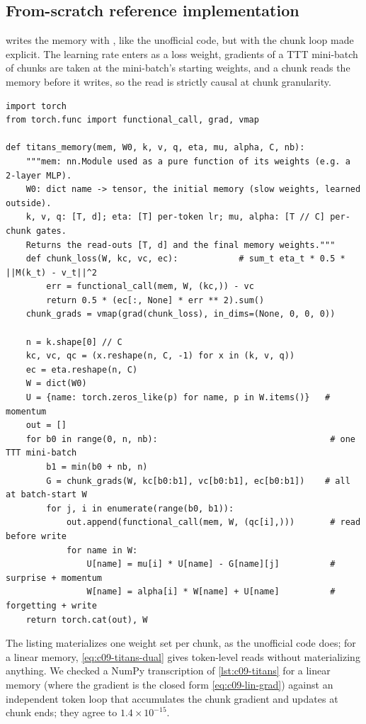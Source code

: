 \subsection{From-scratch reference implementation}

 writes the memory with , like the unofficial code, but
with the chunk loop made explicit. The learning rate enters as a loss weight, gradients of a
TTT mini-batch of  chunks are taken at the mini-batch's starting weights, and a chunk
reads the memory before it writes, so the read is strictly causal at chunk granularity.

\begin{lstlisting}[caption={Reference implementation (ours): Titans-style neural memory with momentum and forgetting.},label={lst:c09-titans}]
import torch
from torch.func import functional_call, grad, vmap

def titans_memory(mem, W0, k, v, q, eta, mu, alpha, C, nb):
    """mem: nn.Module used as a pure function of its weights (e.g. a 2-layer MLP).
    W0: dict name -> tensor, the initial memory (slow weights, learned outside).
    k, v, q: [T, d]; eta: [T] per-token lr; mu, alpha: [T // C] per-chunk gates.
    Returns the read-outs [T, d] and the final memory weights."""
    def chunk_loss(W, kc, vc, ec):            # sum_t eta_t * 0.5 * ||M(k_t) - v_t||^2
        err = functional_call(mem, W, (kc,)) - vc
        return 0.5 * (ec[:, None] * err ** 2).sum()
    chunk_grads = vmap(grad(chunk_loss), in_dims=(None, 0, 0, 0))

    n = k.shape[0] // C
    kc, vc, qc = (x.reshape(n, C, -1) for x in (k, v, q))
    ec = eta.reshape(n, C)
    W = dict(W0)
    U = {name: torch.zeros_like(p) for name, p in W.items()}   # momentum
    out = []
    for b0 in range(0, n, nb):                                  # one TTT mini-batch
        b1 = min(b0 + nb, n)
        G = chunk_grads(W, kc[b0:b1], vc[b0:b1], ec[b0:b1])    # all at batch-start W
        for j, i in enumerate(range(b0, b1)):
            out.append(functional_call(mem, W, (qc[i],)))       # read before write
            for name in W:
                U[name] = mu[i] * U[name] - G[name][j]          # surprise + momentum
                W[name] = alpha[i] * W[name] + U[name]          # forgetting + write
    return torch.cat(out), W
\end{lstlisting}

The listing materializes one weight set per chunk, as the unofficial code does; for a linear
memory, \eqref{eq:c09-titans-dual} gives token-level reads without materializing anything. We
checked a NumPy transcription of \cref{lst:c09-titans} for a linear memory (where the gradient
is the closed form \eqref{eq:c09-lin-grad}) against an independent token loop that accumulates
the chunk gradient and updates at chunk ends; they agree to $1.4\times10^{-15}$.

